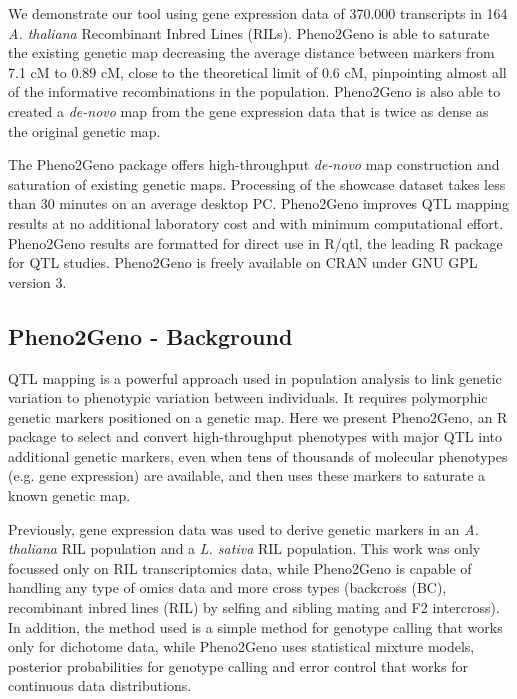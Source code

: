 \documentclass[8pt, twoside, a5paper]{report}
\begin{document}
We demonstrate our tool using gene expression data of 370.000 transcripts in 164 \emph{A. thaliana} Recombinant Inbred Lines (RILs). 
Pheno2Geno is able to saturate the existing genetic map decreasing the average distance between markers from 7.1 cM to 0.89 cM, 
close to the theoretical limit of 0.6 cM, pinpointing almost all of the informative recombinations in the population. Pheno2Geno 
is also able to created a \emph{de-novo} map from the gene expression data that is twice as dense as the original genetic map.

The Pheno2Geno package offers high-throughput \emph{de-novo} map construction and saturation of existing genetic maps. 
Processing of the showcase dataset takes less than 30 minutes on an average desktop PC. 
Pheno2Geno improves QTL mapping results at no additional laboratory cost and with minimum computational effort. Pheno2Geno 
results are formatted for direct use in R/qtl, the leading R package for QTL studies. Pheno2Geno is freely available on 
CRAN under GNU GPL version 3.

\subsection{Pheno2Geno - Background}
QTL mapping \cite{Lander:1989} is a powerful approach used in population analysis to link genetic variation to phenotypic 
variation between individuals. It requires polymorphic genetic markers positioned on a genetic map. Here we present Pheno2Geno, 
an R package to select and convert high-throughput phenotypes with major QTL into additional genetic markers, even when tens of 
thousands of molecular phenotypes (e.g. gene expression) are available, and then uses these markers to saturate a known genetic map.

Previously, gene expression data was used to derive genetic markers in an \emph{A. thaliana} RIL population 
\cite{west:2006} and a \emph{L. sativa} RIL population\cite{Truco:2013}. This work was only focussed only on RIL transcriptomics 
data, while Pheno2Geno is capable of handling any type of omics data and more cross types (backcross (BC), recombinant inbred 
lines (RIL) by selfing and sibling mating and F2 intercross). In addition, the method used\cite{west:2006, Truco:2013} is a simple method for 
genotype calling that works only for dichotome data, while Pheno2Geno uses statistical mixture models, posterior probabilities 
for genotype calling and error control that works for continuous data distributions\cite{jansen:1993, jansen:2001b}. 
\end{document}

